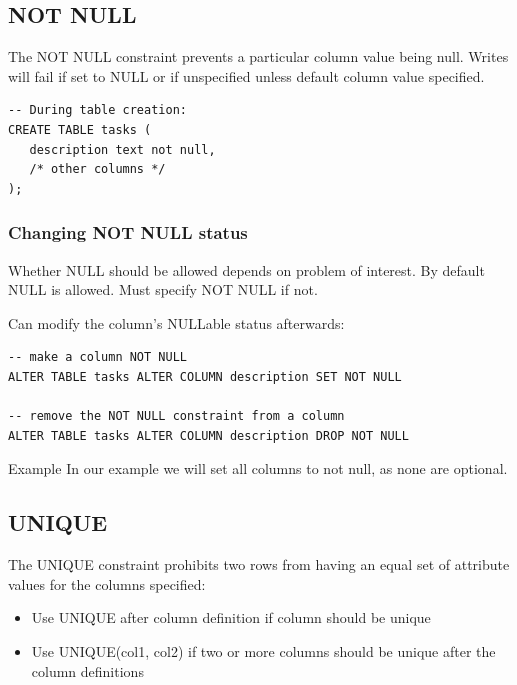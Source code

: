 \documentclass[slides]{pgnotes}
\begin{document}
\subsection{NOT NULL}\label{not-null}

The NOT NULL constraint prevents a particular column value being null.
Writes will fail if set to NULL or if unspecified unless default column value specified.

\begin{verbatim}
-- During table creation:
CREATE TABLE tasks (
   description text not null,
   /* other columns */
);
\end{verbatim}

\newpage
\subsubsection{Changing NOT NULL status}

Whether NULL should be allowed depends on problem of interest.
By default NULL is allowed.
Must specify NOT NULL if not.

Can modify the column's NULLable status afterwards:
\begin{verbatim}
-- make a column NOT NULL
ALTER TABLE tasks ALTER COLUMN description SET NOT NULL

-- remove the NOT NULL constraint from a column
ALTER TABLE tasks ALTER COLUMN description DROP NOT NULL
\end{verbatim}

\begin{greenbox}{Example}
  In our example we will set all columns to not null, as none are optional.
\end{greenbox}


\subsection{UNIQUE}\label{unique}

The UNIQUE constraint prohibits two rows from having an equal set of
attribute values for the columns specified:

\begin{itemize}
\item Use UNIQUE after column definition if column should be unique
\item Use UNIQUE(col1, col2) if two or more columns should be unique after the column definitions
\end{itemize}

\newpage
\end{document}
